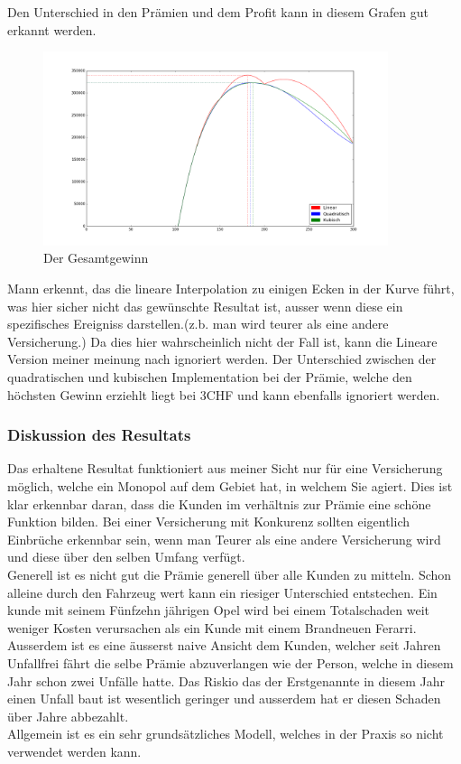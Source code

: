 \documentclass[10pt]{article}         %
\begin{document}
Den Unterschied in den Prämien und dem Profit kann in diesem Grafen gut erkannt werden.
\begin{figure}[!ht]
    \centering
    \includegraphics[width=0.9\textwidth]{profit}
    \caption{Der Gesamtgewinn}
    \label{fig:figure1}
\end{figure}
Mann erkennt, das die lineare Interpolation zu einigen Ecken in der Kurve führt, was hier sicher nicht das gewünschte Resultat ist, ausser wenn diese ein spezifisches Ereigniss darstellen.(z.b. man wird teurer als eine andere Versicherung.) Da dies hier wahrscheinlich nicht der Fall ist, kann die Lineare Version meiner meinung nach ignoriert werden. Der Unterschied zwischen der quadratischen und kubischen Implementation bei der Prämie, welche den höchsten Gewinn erziehlt liegt bei 3CHF und kann ebenfalls ignoriert werden.
\subsubsection{Diskussion des Resultats} %
\label{ssub:diskussion_des_resultats}
Das erhaltene Resultat funktioniert aus meiner Sicht nur für eine Versicherung möglich, welche ein Monopol auf dem Gebiet hat, in welchem Sie agiert. Dies ist klar erkennbar daran, dass die Kunden im verhältnis zur Prämie eine schöne Funktion bilden. Bei einer Versicherung mit Konkurenz sollten eigentlich Einbrüche erkennbar sein, wenn man Teurer als eine andere Versicherung wird und diese über den selben Umfang verfügt. \\
Generell ist es nicht gut die Prämie generell über alle Kunden zu mitteln. Schon alleine durch den Fahrzeug wert kann ein riesiger Unterschied entstechen. Ein kunde mit seinem Fünfzehn jährigen Opel wird bei einem Totalschaden weit weniger Kosten verursachen als ein Kunde mit einem Brandneuen Ferarri.
Ausserdem ist es eine äusserst naive Ansicht dem Kunden, welcher seit Jahren Unfallfrei fährt die selbe Prämie abzuverlangen wie der Person, welche in diesem Jahr schon zwei Unfälle hatte. Das Riskio das der Erstgenannte in diesem Jahr einen Unfall baut ist wesentlich geringer und ausserdem hat er diesen Schaden über Jahre abbezahlt.\\
Allgemein ist es ein sehr grundsätzliches Modell, welches in der Praxis so nicht verwendet werden kann.
\end{document}
